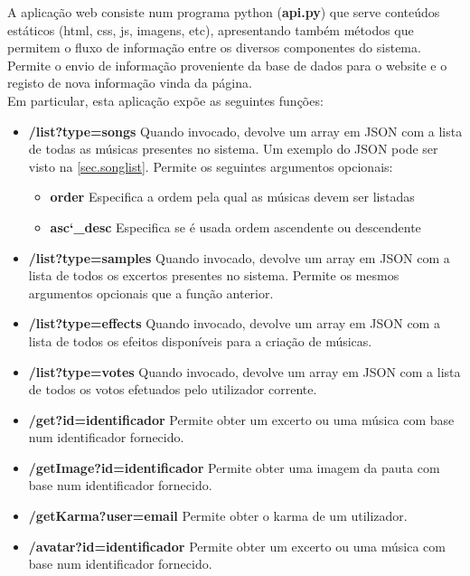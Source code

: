 \documentclass{report}
\begin{document}
A aplicação web consiste num programa python (\textbf{api.py}) que serve conteúdos estáticos (html,
css, js, imagens, etc), apresentando também métodos que permitem o fluxo de informação entre os diversos
componentes do sistema. Permite o envio de informação proveniente da base de dados para o website e o registo de nova informação vinda da página.\\

Em particular, esta aplicação expõe as seguintes funções:

\begin{itemize}
	\item \textbf{/list?type=songs} Quando invocado, devolve um array em JSON com a lista de todas as músicas presentes no sistema.
		Um exemplo do JSON pode ser visto na \autoref{sec.songlist}. Permite os seguintes argumentos opcionais:
		\begin{itemize}
			\item \textbf{order} Especifica a ordem pela qual as músicas devem ser listadas
			\item \textbf{asc\char`_desc} Especifica se é usada ordem ascendente ou descendente
		\end{itemize}

	\item \textbf{/list?type=samples} Quando invocado, devolve um array em JSON com a lista de todos os excertos presentes no sistema.
		Permite os mesmos argumentos opcionais que a função anterior.

	\item \textbf{/list?type=effects} Quando invocado, devolve um array em JSON com a lista de todos os efeitos disponíveis para a criação de músicas.

	\item \textbf{/list?type=votes} Quando invocado, devolve um array em JSON com a lista de todos os votos efetuados pelo utilizador corrente.

	\item \textbf{/get?id=identificador} Permite obter um excerto ou uma música com base num identificador fornecido.

	\item \textbf{/getImage?id=identificador} Permite obter uma imagem da pauta com base num identificador fornecido.

	\item \textbf{/getKarma?user=email} Permite obter o karma de um utilizador.

	\item \textbf{/avatar?id=identificador} Permite obter um excerto ou uma música com base num identificador fornecido.


\end{itemize}
\end{document}
